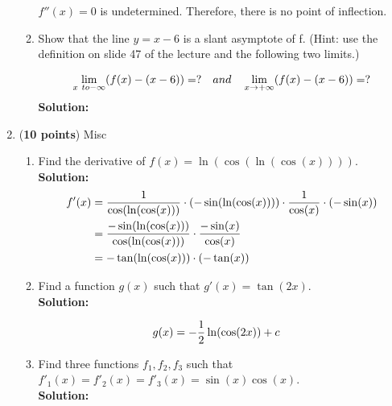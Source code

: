 \documentclass[a4paper]{article}
\begin{document}
\begin{enumerate}
\begin{enumerate}
$f''(x) = 0$ is undetermined. Therefore, there is no point of inflection.	
	
	\item Show that the line $y = x - 6$ is a slant asymptote of f. (Hint: use the definition on slide 47 of the lecture and the following two limits.)
	
	\begin{align}
		\lim_{x \ to -\infty}(f(x) - (x-6)) = ? \quad and \quad \lim_{x \to +\infty}(f(x) - (x-6)) = ?\notag
	\end{align}		
\textbf{Solution:}\\	
	
	
\end{enumerate}


\item (\textbf{10 points}) Misc

\begin{enumerate}
	\item Find the derivative of $f(x) = \ln(\cos(\ln(\cos(x)))).$\\
	\textbf{Solution:}\\
	
	
\begin{align}
	f'(x) &= \frac{1}{\cos(\ln(\cos(x)))} \cdot (-\sin(\ln(\cos(x)))) \cdot \frac{1}{\cos(x)} \cdot (-\sin(x))\notag\\
	&= \frac{-\sin(\ln(\cos(x)))}{\cos(\ln(\cos(x)))} \cdot \frac{-\sin(x)}{\cos(x)}\notag\\
	&= -\tan(\ln(\cos(x))) \cdot (-\tan(x))\notag
\end{align}	
	
	
	
	\item Find a function $g(x)$ such that $g'(x) = \tan(2x).$\\
	\textbf{Solution:}
	
\begin{align*}
	g(x) &= -\frac{1}{2}\ln(\cos(2x)) + c\notag
\end{align*}	
\vspace{1em}		
	
	
	\item Find three functions $f_1, f_2, f_3$ such that $f'_1(x) = f'_2(x) = f'_3(x) = \sin(x)\cos(x)$.\\
	\textbf{Solution:}\\
		
	
\end{enumerate}




\end{enumerate}
\end{document}
